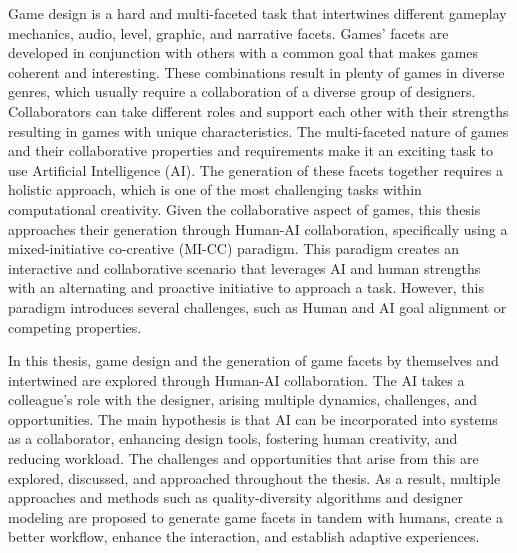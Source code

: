 \documentclass[hidelinks,green,onecolumn,twoside]{dissertation}
\begin{document}
Game design is a hard and multi-faceted task that intertwines different gameplay mechanics, audio, level, graphic, and narrative facets. Games' facets are developed in conjunction with others with a common goal that makes games coherent and interesting. These combinations result in plenty of games in diverse genres, which usually require a collaboration of a diverse group of designers. Collaborators can take different roles and support each other with their strengths resulting in games with unique characteristics. The multi-faceted nature of games and their collaborative properties and requirements make it an exciting task to use Artificial Intelligence (AI). The generation of these facets together requires a holistic approach, which is one of the most challenging tasks within computational creativity. Given the collaborative aspect of games, this thesis approaches their generation through Human-AI collaboration, specifically using a mixed-initiative co-creative (MI-CC) paradigm. This paradigm creates an interactive and collaborative scenario that leverages AI and human strengths with an alternating and proactive initiative to approach a task. However, this paradigm introduces several challenges, such as Human and AI goal alignment or competing properties. %

In this thesis, game design and the generation of game facets by themselves and intertwined are explored through Human-AI collaboration. The AI takes a colleague's role with the designer, arising multiple dynamics, challenges, and opportunities. The main hypothesis is that AI can be incorporated into systems as a collaborator, enhancing design tools, fostering human creativity, and reducing workload. The challenges and opportunities that arise from this are explored, discussed, and approached throughout the thesis. As a result, multiple approaches and methods such as quality-diversity algorithms and designer modeling are proposed to generate game facets in tandem with humans, create a better workflow, enhance the interaction, and establish adaptive experiences.
\end{document}
